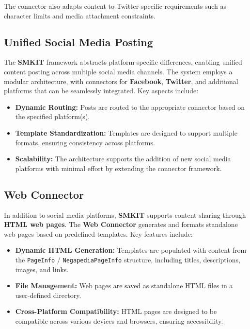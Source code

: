 The connector also adapts content to Twitter-specific requirements such as character limits and media attachment constraints.

\subsection{Unified Social Media Posting}
\label{subsec:unified_social_media_posting}
The \textbf{SMKIT} framework abstracts platform-specific differences, enabling unified content posting across multiple social media channels. The system employs a modular architecture, with connectors for \textbf{Facebook}, \textbf{Twitter}, and additional platforms that can be seamlessly integrated. Key aspects include:

\begin{itemize}
    \item \textbf{Dynamic Routing:} Posts are routed to the appropriate connector based on the specified platform(s).
    \item \textbf{Template Standardization:} Templates are designed to support multiple formats, ensuring consistency across platforms.
    \item \textbf{Scalability:} The architecture supports the addition of new social media platforms with minimal effort by extending the connector framework.
\end{itemize}

\subsection{Web Connector}
\label{subsec:web_connector}
In addition to social media platforms, \textbf{SMKIT} supports content sharing through \textbf{HTML web pages}. The \textbf{Web Connector} generates and formats standalone web pages based on predefined templates. Key features include:

\begin{itemize}
    \item \textbf{Dynamic HTML Generation:} Templates are populated with content from the \texttt{PageInfo} / \texttt{NegapediaPageInfo} structure, including titles, descriptions, images, and links.
    \item \textbf{File Management:} Web pages are saved as standalone HTML files in a user-defined directory.
    \item \textbf{Cross-Platform Compatibility:} HTML pages are designed to be compatible across various devices and browsers, ensuring accessibility.
\end{itemize}

